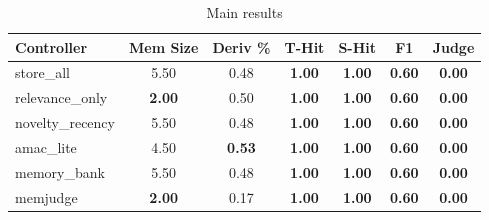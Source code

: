 \begin{table}[t]
\centering
\caption{Main results}
\label{tab:main}
\begin{tabular}{lcccccc}
\toprule
Controller & Mem Size & Deriv \% & T-Hit & S-Hit & F1 & Judge \\
\midrule
store\_all & 5.50 & 0.48 & \textbf{1.00} & \textbf{1.00} & \textbf{0.60} & \textbf{0.00} \\
relevance\_only & \textbf{2.00} & 0.50 & \textbf{1.00} & \textbf{1.00} & \textbf{0.60} & \textbf{0.00} \\
novelty\_recency & 5.50 & 0.48 & \textbf{1.00} & \textbf{1.00} & \textbf{0.60} & \textbf{0.00} \\
amac\_lite & 4.50 & \textbf{0.53} & \textbf{1.00} & \textbf{1.00} & \textbf{0.60} & \textbf{0.00} \\
memory\_bank & 5.50 & 0.48 & \textbf{1.00} & \textbf{1.00} & \textbf{0.60} & \textbf{0.00} \\
memjudge & \textbf{2.00} & 0.17 & \textbf{1.00} & \textbf{1.00} & \textbf{0.60} & \textbf{0.00} \\
\bottomrule
\end{tabular}
\end{table}